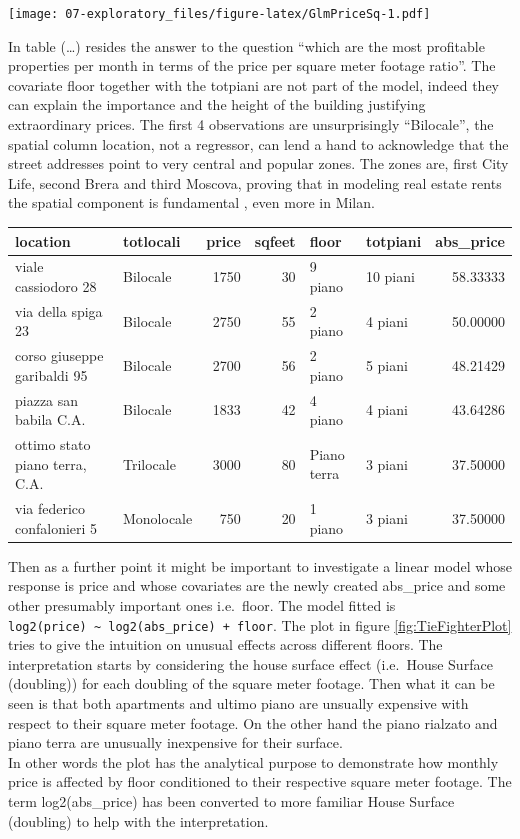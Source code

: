 \documentclass[
  12pt,
  a4paper,
  oneside]{book}
\theoremstyle{definition}
\theoremstyle{definition}
\theoremstyle{definition}
\theoremstyle{remark}
\begin{document}
\texttt{[image: 07-exploratory\_files/figure-latex/GlmPriceSq-1.pdf]}

In table (\ldots) resides the answer to the question ``which are the most profitable properties per month in terms of the price per square meter footage ratio''. The covariate floor together with the totpiani are not part of the model, indeed they can explain the importance and the height of the building justifying extraordinary prices. The first 4 observations are unsurprisingly ``Bilocale'', the spatial column location, not a regressor, can lend a hand to acknowledge that the street addresses point to very central and popular zones. The zones are, first City Life, second Brera and third Moscova, proving that in modeling real estate rents the spatial component is fundamental , even more in Milan.

\begin{tabular}{llrrllr}
\toprule
location & totlocali & price & sqfeet & floor & totpiani & abs\_price\\
\midrule
viale cassiodoro 28 & Bilocale & 1750 & 30 & 9 piano & 10 piani & 58.33333\\
via della spiga 23 & Bilocale & 2750 & 55 & 2 piano & 4 piani & 50.00000\\
corso giuseppe garibaldi 95 & Bilocale & 2700 & 56 & 2 piano & 5 piani & 48.21429\\
piazza san babila C.A. & Bilocale & 1833 & 42 & 4 piano & 4 piani & 43.64286\\
ottimo stato piano terra, C.A. & Trilocale & 3000 & 80 & Piano terra & 3 piani & 37.50000\\
\addlinespace
via federico confalonieri 5 & Monolocale & 750 & 20 & 1 piano & 3 piani & 37.50000\\
\bottomrule
\end{tabular}

Then as a further point it might be important to investigate a linear model whose response is price and whose covariates are the newly created abs\_price and some other presumably important ones i.e.~floor. The model fitted is \texttt{log2(price)\ \textasciitilde{}\ log2(abs\_price)\ +\ floor}.
The plot in figure \ref{fig:TieFighterPlot} tries to give the intuition on unusual effects across different floors. The interpretation starts by considering the house surface effect (i.e.~House Surface (doubling)) for each doubling of the square meter footage. Then what it can be seen is that both apartments and ultimo piano are unsually expensive with respect to their square meter footage. On the other hand the piano rialzato and piano terra are unusually inexpensive for their surface.\\
In other words the plot has the analytical purpose to demonstrate how monthly price is affected by floor conditioned to their respective square meter footage. The term log2(abs\_price) has been converted to more familiar House Surface (doubling) to help with the interpretation.
\end{document}
